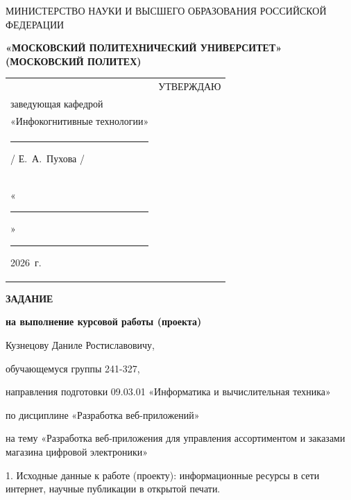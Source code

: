 \documentclass[14pt, a4paper]{extarticle}
\begin{document}
\pagestyle{empty}


\begin{center}
    {\small МИНИСТЕРСТВО НАУКИ И ВЫСШЕГО ОБРАЗОВАНИЯ РОССИЙСКОЙ ФЕДЕРАЦИИ}


    {\small \textbf{«МОСКОВСКИЙ ПОЛИТЕХНИЧЕСКИЙ УНИВЕРСИТЕТ»}} \\
    {\small \textbf{(МОСКОВСКИЙ ПОЛИТЕХ)}}
\end{center}

\begin{tabularx}{\textwidth}{@{} p{} p{} @{}}
     &
    \raggedright
    УТВЕРЖДАЮ                          \\
    заведующая кафедрой                \\
    «Инфокогнитивные технологии»       \\[0.3cm]

    \rule{3cm}{0.4pt} / Е.~А.~Пухова / \\[0.1cm]

    «\rule{0.8cm}{0.4pt}» \rule{3cm}{0.4pt} 2026~г.
\end{tabularx}


\begin{center}

    { \large \textbf{ЗАДАНИЕ}}

    \textbf{на выполнение курсовой работы (проекта)}

    Кузнецову Даниле Ростиславовичу,

\end{center}

обучающемуся группы 241-327,

направления подготовки 09.03.01 «Информатика и вычислительная техника»

по дисциплине «Разработка веб-приложений»

на тему «Разработка веб-приложения для управления ассортиментом и заказами
магазина цифровой электроники»

1. Исходные данные к работе (проекту): информационные ресурсы в сети
интернет, научные публикации в открытой печати.
\end{document}
